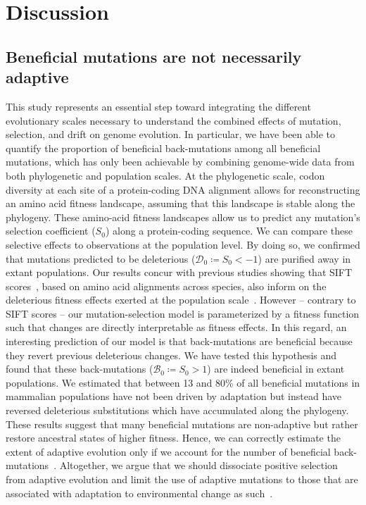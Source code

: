 \documentclass[12pt]{article}
\newcommand{\Sphy}{S_{0}}
\newcommand{\SphyDel}{\mathcal{D}_0}
\newcommand{\SphyBen}{\mathcal{B}_0}
\begin{document}
\section*{Discussion}
\subsection*{Beneficial mutations are not necessarily adaptive}

This study represents an essential step toward integrating the different evolutionary scales necessary to understand the combined effects of mutation, selection, and drift on genome evolution.
In particular, we have been able to quantify the proportion of beneficial back-mutations among all beneficial mutations, which has only been achievable by combining genome-wide data from both phylogenetic and population scales.
At the phylogenetic scale, codon diversity at each site of a protein-coding DNA alignment allows for reconstructing an amino acid fitness landscape, assuming that this landscape is stable along the phylogeny.
These amino-acid fitness landscapes allow us to predict any mutation’s selection coefficient ($\Sphy$) along a protein-coding sequence.
We can compare these selective effects to observations at the population level.
By doing so, we confirmed that mutations predicted to be deleterious ($\SphyDel \coloneqq \Sphy < -1$) are purified away in extant populations.
Our results concur with previous studies showing that SIFT scores~\cite{ng_sift_2003, vaser_sift_2016}, based on amino acid alignments across species, also inform on the deleterious fitness effects exerted at the population scale~\cite{chen_hunting_2021}.
However – contrary to SIFT scores – our mutation-selection model is parameterized by a fitness function such that changes are directly interpretable as fitness effects.
In this regard, an interesting prediction of our model is that back-mutations are beneficial because they revert previous deleterious changes.
We have tested this hypothesis and found that these back-mutations ($\SphyBen \coloneqq \Sphy > 1 $) are indeed beneficial in extant populations.
We estimated that between 13 and 80\% of all beneficial mutations in mammalian populations have not been driven by adaptation but instead have reversed deleterious substitutions which have accumulated along the phylogeny.
These results suggest that many beneficial mutations are non-adaptive but rather restore ancestral states of higher fitness.
Hence, we can correctly estimate the extent of adaptive evolution only if we account for the number of beneficial back-mutations~\cite{keightley_what_2010, rice_evolutionarily_2015}.
Altogether, we argue that we should dissociate positive selection from adaptive evolution and limit the use of adaptive mutations to those that are associated with adaptation to environmental change as such~\cite{charlesworth_other_2007, mustonen_fitness_2009}.
\end{document}

